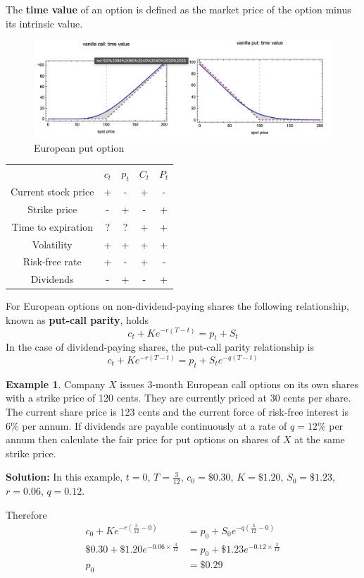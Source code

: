 \documentclass[11pt,a4paper]{book}
\theoremstyle{definition}\newtheorem{definition}{Definition}
\theoremstyle{definition}\newtheorem{fact}{Fact}
\theoremstyle{definition}\newtheorem{remark}{Remark}
\theoremstyle{definition}\newtheorem{ex}{Ex.}
\theoremstyle{definition}\newtheorem{project}{Project}
\theoremstyle{definition}\newtheorem{problem}{Problem}
\theoremstyle{definition}\newtheorem{example}{Example}
\numberwithin{theorem}{section}
\numberwithin{corollary}{chapter}
\numberwithin{assumption}{chapter}
\numberwithin{definition}{chapter}
\numberwithin{prop}{chapter}
\numberwithin{notation}{chapter}
\numberwithin{problem}{chapter}
\numberwithin{example}{chapter}
\numberwithin{fact}{chapter}
\numberwithin{ex}{chapter}
\begin{document}
The \textbf{time value} of an option is defined as the market price of the option minus its intrinsic value.

\begin{figure}[H]
	\centering
	\includegraphics[scale=0.5]{Chapter 3/Chapter3_3.png}
	\caption{European put option}
\end{figure}

\begin{table}[H]
\centering
\begin{tabular}{ccccc}
\hline
 & $c_t$ & $p_t$ & $C_t$ & $P_t$ \\
Current stock price & + & - & + & - \\
Strike price & - & + & - & + \\
Time to expiration & ? & ? & + & + \\
Volatility & + & + & + & + \\
Risk-free rate & + & - & + & - \\
Dividends & - & + & - & + \\
\end{tabular}
\end{table}

For European options on non-dividend-paying shares the following relationship, known as \textbf{put-call parity}, holds
\begin{equation}
c_t + K e^{-r(T-t)} = p_t + S_t
\end{equation}
In the case of dividend-paying shares, the put-call parity relationship is
\begin{equation}
c_t + K e^{-r(T-t)} = p_t + S_te^{-q(T-t)}
\end{equation}

\begin{example}
Company $X$ issues 3-month European call options on its own shares with a strike price of 120 cents. They are currently priced at 30 cents per share. The current share price is 123 cents and the current force of risk-free interest is 6\% per annum. If dividends are payable continuously at a rate of $q = 12\%$ per annum then calculate the fair price for put options on shares of $X$ at the same strike price.

\pagebreak
\textbf{Solution:}
In this example, $t=0$, $T = \frac{3}{12}$, $c_0 = \$0.30$, $K=\$1.20$, $S_0 = \$ 1.23$, $r=0.06$, $q=0.12$.

Therefore
\begin{align*}
c_0 + K e^{-r(\frac{3}{12}-0)} &= p_0 + S_0e^{-q(\frac{3}{12}-0)}  \\
\$0.30 + \$1.20 e^{-0.06 \times\frac{3}{12}} &= p_0 + \$1.23 e^{-0.12\times \frac{3}{12}} \\
p_0 &= \$0.29
\end{align*}
\end{example}
\end{document}
